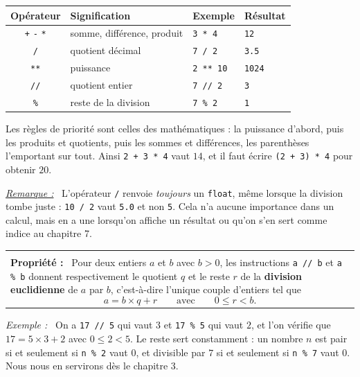 \documentclass[a4paper,11pt,openany]{book}
\makeatletter
\newcommand{\code}[1]{\texttt{\textcolor{codebleu}{#1}}}
\newenvironment{cadre}%
 {\par\vspace{2mm}\noindent\begin{tabular}{|@{\hspace{4mm}}p{0.93\textwidth}@{\hspace{4mm}}|}
  \hline \\[-2mm]}%
 {\\[2mm] \hline \end{tabular}\par\vspace{3mm}}
\newcommand{\propo}[1]{\textbf{Propriété #1 :}~}
\newenvironment{exemple}%
 {\par\vspace{1mm}\begin{list}{}{\leftmargin=1cm \rightmargin=0.5cm}\item[]%
  \textit{Exemple :}~}%
 {\end{list}\vspace{1mm}}
\newenvironment{remarque}%
 {\par\vspace{1mm}\begin{list}{}{\leftmargin=1cm \rightmargin=0.5cm}\item[]%
  \textit{\underline{Remarque :}}~}%
 {\end{list}\vspace{1mm}}
\renewcommand{\arraystretch}{1.4}
\makeatother
\begin{document}
\begin{center}
\renewcommand{\arraystretch}{1.5}
\begin{tabular}{|c|l|l|l|}
\hline
\rowcolor{orange!50} \textbf{Opérateur} & \textbf{Signification} & \textbf{Exemple} & \textbf{Résultat} \\
\hline
\code{+} \quad \code{-} \quad \code{*} & somme, différence, produit & \code{3 * 4} & \code{12} \\
\hline
\code{/} & quotient décimal & \code{7 / 2} & \code{3.5} \\
\hline
\code{**} & puissance & \code{2 ** 10} & \code{1024} \\
\hline
\code{//} & quotient entier & \code{7 // 2} & \code{3} \\
\hline
\code{\%} & reste de la division & \code{7 \% 2} & \code{1} \\
\hline
\end{tabular}
\end{center}

Les règles de priorité sont celles des mathématiques : la puissance d'abord, puis les produits et quotients, puis les sommes et différences, les parenthèses l'emportant sur tout. Ainsi \code{2 + 3 * 4} vaut $14$, et il faut écrire \code{(2 + 3) * 4} pour obtenir $20$.

\begin{remarque}
L'opérateur \code{/} renvoie \emph{toujours} un \code{float}, même lorsque la division tombe juste : \code{10 / 2} vaut \code{5.0} et non \code{5}. Cela n'a aucune importance dans un calcul, mais en a une lorsqu'on affiche un résultat ou qu'on s'en sert comme indice au chapitre 7.
\end{remarque}

\begin{cadre}
\propo{} Pour deux entiers $a$ et $b$ avec $b > 0$, les instructions \code{a // b} et \code{a \% b} donnent respectivement le quotient $q$ et le reste $r$ de la \textbf{division euclidienne} de $a$ par $b$, c'est-à-dire l'unique couple d'entiers tel que
\[ a = b \times q + r \qquad \text{avec} \qquad 0 \leqslant r < b .\]
\end{cadre}

\begin{exemple}
On a \code{17 // 5} qui vaut $3$ et \code{17 \% 5} qui vaut $2$, et l'on vérifie que $17 = 5 \times 3 + 2$ avec $0 \leqslant 2 < 5$. Le reste sert constamment : un nombre $n$ est pair si et seulement si \code{n \% 2} vaut $0$, et divisible par $7$ si et seulement si \code{n \% 7} vaut $0$. Nous nous en servirons dès le chapitre 3.
\end{exemple}
\end{document}
